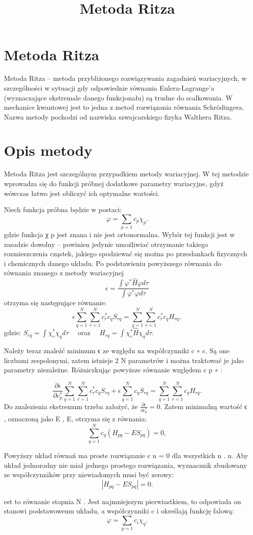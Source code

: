 \documentclass{article}
\begin{document}
\title{Metoda Ritza}
\maketitle

\section{Metoda Ritza}
Metoda Ritza – metoda przybliżonego rozwiązywania zagadnień wariacyjnych, w szczególności w sytuacji gdy odpowiednie równania Eulera-Lagrange’a (wyznaczające ekstremale danego funkcjonału) są trudne do scalkowania. W mechanice kwantowej jest to jedna z metod rozwiązania równania Schrödingera. Nazwa metody pochodzi od nazwiska szwajcarskiego fizyka Walthera Ritza. 

\section{Opis metody}
Metoda Ritza jest szczególnym przypadkiem metody wariacyjnej. W tej metodzie wprowadza się do funkcji próbnej dodatkowe parametry wariacyjne, gdyż wówczas łatwo jest obliczyć ich optymalne wartości.

Niech funkcja próbna będzie w postaci: 
$${ \varphi =\sum \limits _{p=1}c_{p}\chi _{p}.}$$
gdzie funkcja χ p  jest znana i nie jest ortonormalna. Wybór tej funkcji jest w zasadzie dowolny – powinien jedynie umożliwiać otrzymanie takiego rozmieszczenia cząstek, jakiego spodziewać się można po przesłankach fizycznych i chemicznych danego układu. Po podstawieniu powyższego równania do równania znanego z metody wariacyjnej
$${ \epsilon ={\frac {\int \varphi ^{*}{\hat {H}}\varphi d\tau }{\int \varphi ^{*}\varphi d\tau }}}$$
otrzyma się następujące równanie: 
$${ \epsilon \sum \limits _{q=1}^{N}\sum \limits _{r=1}^{N}c_{r}^{*}c_{q}S_{rq}=\sum \limits _{q=1}^{N}\sum \limits _{r=1}^{N}c_{r}^{*}c_{q}H_{rq},}$$
gdzie:
${ S_{rq}=\int \chi _{r}^{*}\chi _{q}d\tau \quad {}}$ oraz ${ {}\quad H_{rq}=\int \chi _{r}^{*}{\hat {H}}\chi _{q}d\tau .}$

Należy teraz znaleźć minimum ϵ ze względu na współczynniki c ∗ c. Są one liczbami zespolonymi, zatem istnieje 2 N  parametrów i można traktować je jako parametry niezależne. Różniczkując powyższe równanie względem c p ∗ :

$${ {\frac {\partial \epsilon }{\partial c_{p}^{*}}}\sum \limits _{q=1}^{N}\sum \limits _{r=1}^{N}c_{r}^{*}c_{q}S_{rq}+\epsilon \sum \limits _{q=1}^{N}c_{q}S_{rq}=\sum \limits _{q=1}^{N}\sum \limits _{r=1}^{N}c_{q}H_{rq}.}$$
Do znalezienia ekstremum trzeba założyć, że ${ {\frac {\partial \epsilon }{\partial c_{p}^{*}}}=0.}$
Zatem minimalną wartość ϵ , oznaczoną jako E , E, otrzyma się z równania: 
$${ \sum \limits _{q=1}^{N}c_{q}(H_{pq}-ES_{pq})=0,}$$

Powyższy układ równań ma proste rozwiązanie c n = 0 dla wszystkich n . n. Aby układ jednorodny nie miał jednego prostego rozwiązania, wyznacznik zbudowany ze współczynników przy niewiadomych musi być zerowy:
$${ |H_{pq}-ES_{pq}|=0.}$$

est to równanie stopnia N . Jest najmniejszym pierwiastkiem, to odpowiada on stanowi podstawowemu układu, a współczynniki c i określają funkcję falową: 
$${ \varphi =\sum \limits _{p=1}c_{i}\chi _{q}.}$$
\end{document}
